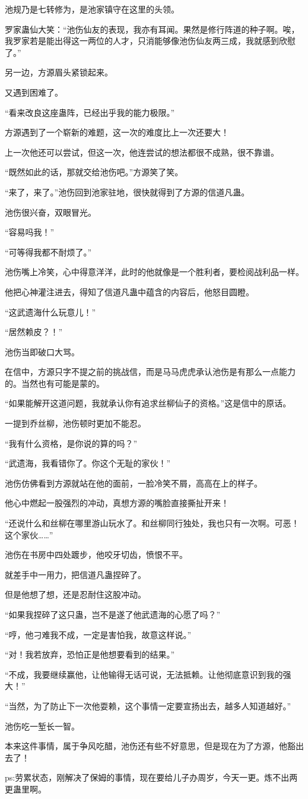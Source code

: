 \begin{this_body}
池规乃是七转修为，是池家镇守在这里的头领。

罗家蛊仙大笑：“池伤仙友的表现，我亦有耳闻。果然是修行阵道的种子啊。唉，我罗家若是能出得这一两位的人才，只消能够像池伤仙友两三成，我就感到欣慰了。”

另一边，方源眉头紧锁起来。

又遇到困难了。

“看来改良这座蛊阵，已经出乎我的能力极限。”

方源遇到了一个崭新的难题，这一次的难度比上一次还要大！

上一次他还可以尝试，但这一次，他连尝试的想法都很不成熟，很不靠谱。

“既然如此的话，那就交给池伤吧。”方源笑了笑。

“来了，来了。”池伤回到池家驻地，很快就得到了方源的信道凡蛊。

池伤很兴奋，双眼冒光。

“容易吗我！”

“可等得我都不耐烦了。”

池伤嘴上冷笑，心中得意洋洋，此时的他就像是一个胜利者，要检阅战利品一样。

他把心神灌注进去，得知了信道凡蛊中蕴含的内容后，他怒目圆瞪。

“这武遗海什么玩意儿！”

“居然赖皮？！”

池伤当即破口大骂。

在信中，方源只字不提之前的挑战信，而是马马虎虎承认池伤是有那么一点能力的。当然也有可能是蒙的。

“如果能解开这道问题，我就承认你有追求丝柳仙子的资格。”这是信中的原话。

一提到乔丝柳，池伤顿时更加不能忍。

“我有什么资格，是你说的算的吗？”

“武遗海，我看错你了。你这个无耻的家伙！”

池伤仿佛看到方源就站在他的面前，一脸冷笑不屑，高高在上的样子。

他心中燃起一股强烈的冲动，真想方源的嘴脸直接撕扯开来！

“还说什么和丝柳在哪里游山玩水了。和丝柳同行独处，我也只有一次啊。可恶！这个家伙……”

池伤在书房中四处踱步，他咬牙切齿，愤恨不平。

就差手中一用力，把信道凡蛊捏碎了。

但是他想了想，还是忍耐住这股冲动。

“如果我捏碎了这只蛊，岂不是遂了他武遗海的心愿了吗？”

“哼，他刁难我不成，一定是害怕我，故意这样说。”

“对！我若放弃，恐怕正是他想要看到的结果。”

“不成，我要继续赢他，让他输得无话可说，无法抵赖。让他彻底意识到我的强大！”

“当然，为了防止下一次他耍赖，这个事情一定要宣扬出去，越多人知道越好。”

池伤吃一堑长一智。

本来这件事情，属于争风吃醋，池伤还有些不好意思，但是现在为了方源，他豁出去了！

ps:劳累状态，刚解决了保姆的事情，现在要给儿子办周岁，今天一更。炼不出两更蛊里啊。

\end{this_body}

